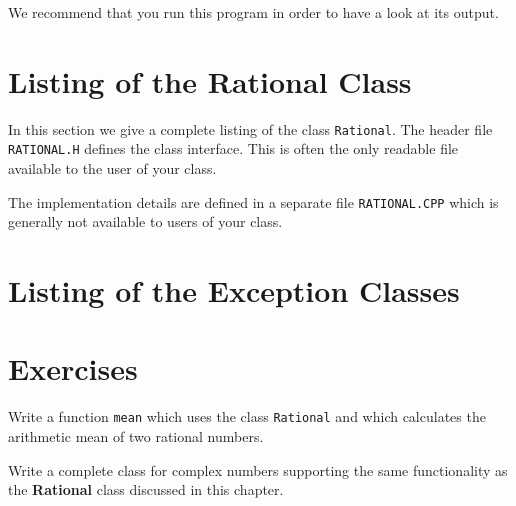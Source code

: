 We recommend that you run this program in order to have a look at its output.


\section{Listing of the Rational Class \label{secADTTemplatesListrational}}

In this section we give a complete listing of the class \verb+Rational+.
The header file \verb+RATIONAL.H+ defines the class interface. This is
often the only readable file available to the user of your class.

{\footnotesize }

The implementation details are defined in a separate file \verb+RATIONAL.CPP+
which is generally not available to users of your class.

{\footnotesize }


\section{Listing of the Exception Classes \label{secADTTemplatesListrational}}

{\footnotesize }


\section{Exercises}

\begin{exercises}  
  \item Write a function \verb+mean+ which uses the class \verb+Rational+ and
          which calculates the arithmetic mean of two rational numbers.

  \item Write a complete class for complex numbers supporting the same 
          functionality as the {\bf Rational} class discussed in this 
          chapter.

\end{exercises}

